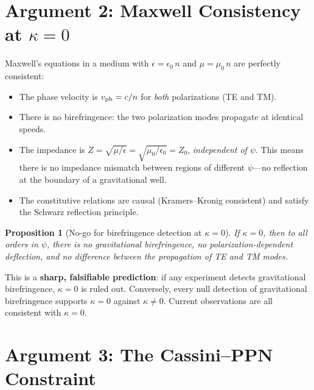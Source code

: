 \documentclass[12pt,a4paper]{article}
\newtheorem{proposition}{Proposition}
\theoremstyle{definition}
\theoremstyle{remark}
\begin{document}
\section{Argument 2: Maxwell Consistency at $\kappa = 0$}
\label{sec:maxwell-consistency}

Maxwell's equations in a medium with $\epsilon = \epsilon_0\, n$ and
$\mu = \mu_0\, n$ are perfectly consistent:
\begin{itemize}
\item The phase velocity is $v_{\rm ph} = c/n$ for \emph{both}
  polarizations (TE and TM).
\item There is no birefringence: the two polarization modes propagate
  at identical speeds.
\item The impedance is $Z = \sqrt{\mu/\epsilon} = \sqrt{\mu_0/\epsilon_0}
  = Z_0$, \emph{independent of $\psi$}.  This means there is no
  impedance mismatch between regions of different $\psi$---no
  reflection at the boundary of a gravitational well.
\item The constitutive relations are causal (Kramers--Kronig consistent)
  and satisfy the Schwarz reflection principle.
\end{itemize}

\begin{proposition}[No-go for birefringence detection at $\kappa = 0$]
If $\kappa = 0$, then to \emph{all orders} in $\psi$, there is no
gravitational birefringence, no polarization-dependent deflection, and
no difference between the propagation of TE and TM modes.
\end{proposition}

This is a \textbf{sharp, falsifiable prediction}: if any experiment
detects gravitational birefringence, $\kappa = 0$ is ruled out.
Conversely, every null detection of gravitational birefringence supports
$\kappa = 0$ against $\kappa \neq 0$.  Current observations are all
consistent with $\kappa = 0$.

\section{Argument 3: The Cassini--PPN Constraint}
\label{sec:cassini}
\end{document}
